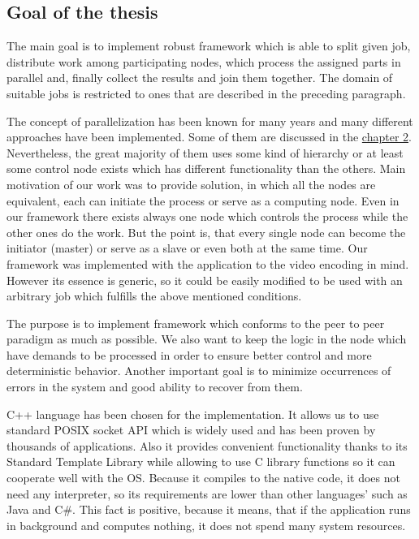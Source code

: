 \subsection*{Goal of the thesis} %
The main goal is to implement robust framework which is able to split given job, distribute work among participating nodes, which process the assigned parts in parallel and, finally collect the results and join them together. The domain of suitable jobs is restricted to ones that are described in the preceding paragraph.

The concept of parallelization has been known for many years and many different approaches have been implemented. Some of them are discussed in the \hyperref[installation-and-use]{chapter 2}. Nevertheless, the great majority of them uses some kind of hierarchy or at least some control node exists which has different functionality than the others. Main motivation of our work was to provide solution, in which all the nodes are equivalent, each can initiate the process or serve as a computing node. Even in our framework there exists always one node which controls the process while the other ones do the work. But the point is, that every single node can become the initiator (master) or serve as a slave or even both at the same time. Our framework was implemented with the application to the video encoding in mind. However its essence is generic, so it could be easily modified to be used with an arbitrary job which fulfills the above mentioned conditions.

The purpose is to implement framework which conforms to the peer to peer paradigm as much as possible. We also want to keep the logic in the node which have demands to be processed in order to ensure better control and more deterministic behavior. Another important goal is to minimize occurrences of errors in the system and good ability to recover from them.

C++ language has been chosen for the implementation. It allows us to use standard POSIX socket API which is widely used and has been proven by thousands of applications. Also it provides convenient functionality thanks to its Standard Template Library while allowing to use C library functions so it can cooperate well with the OS. Because it compiles to the native code, it does not need any interpreter, so its requirements are lower than other languages' such as Java and C#. This fact is positive, because it means, that if the application runs in background and computes nothing, it does not spend many system resources.

